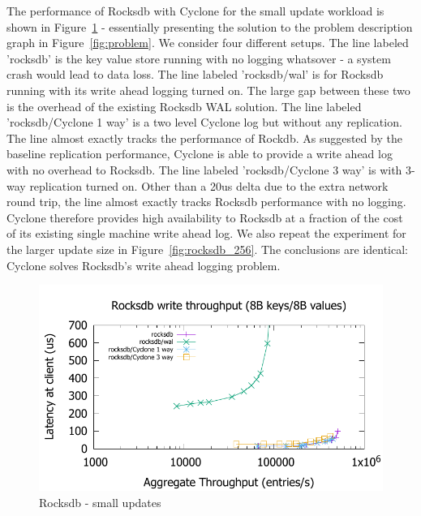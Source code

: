 \documentclass[10pt, preprint, nonatbib]{sigplanconf}
\begin{document}
The performance of Rocksdb with Cyclone for the small update workload is shown
in Figure~\ref{fig:rocksdb} - essentially presenting the solution to the problem
description graph in Figure~\ref{fig:problem}.  We consider four different
setups. The line labeled 'rocksdb' is the key value store running with no
logging whatsover - a system crash would lead to data loss. The line labeled
'rocksdb/wal' is for Rocksdb running with its write ahead logging turned on. The
large gap between these two is the overhead of the existing Rocksdb WAL
solution. The line labeled 'rocksdb/Cyclone 1 way' is a two level Cyclone log
but without any replication. The line almost exactly tracks the performance of
Rockdb. As suggested by the baseline replication performance, Cyclone is able to
provide a write ahead log with no overhead to Rocksdb. The line labeled
'rocksdb/Cyclone 3 way' is with 3-way replication turned on. Other than a 20us
delta due to the extra network round trip, the line almost exactly tracks
Rocksdb performance with no logging. Cyclone therefore provides high
availability to Rocksdb at a fraction of the cost of its existing single machine
write ahead log. We also repeat the experiment for the larger update size in
Figure~\ref{fig:rocksdb_256}. The conclusions are identical: Cyclone solves
Rocksdb's write ahead logging problem.

\begin{figure}
\includegraphics[scale=0.6]{results2/rocksdb.pdf}
\caption{Rocksdb - small updates}
\label{fig:rocksdb}
\end{figure}
\end{document}
